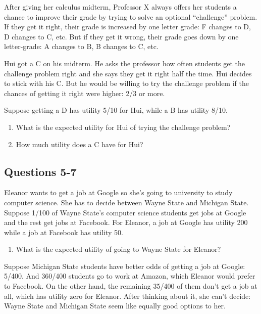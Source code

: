 \documentclass[
  11pt,
]{article}
\providecommand{\tightlist}{%
  \setlength{\itemsep}{0pt}\setlength{\parskip}{0pt}}
\begin{document}
After giving her calculus midterm, Professor X always offers her
students a chance to improve their grade by trying to solve an optional
``challenge'' problem. If they get it right, their grade is increased by
one letter grade: F changes to D, D changes to C, etc. But if they get
it wrong, their grade goes down by one letter-grade: A changes to B, B
changes to C, etc.

Hui got a C on his midterm. He asks the professor how often students get
the challenge problem right and she says they get it right half the
time. Hui decides to stick with his C. But he would be willing to try
the challenge problem if the chances of getting it right were higher:
2/3 or more.

Suppose getting a D has utility 5/10 for Hui, while a B has utility
8/10.

\begin{enumerate}
\def\labelenumi{\arabic{enumi}.}
\setcounter{enumi}{2}
\tightlist
\item
  What is the expected utility for Hui of trying the challenge problem?
\item
  How much utility does a C have for Hui?
\end{enumerate}

\hypertarget{questions-5-7}{%
\subsection{Questions 5-7}\label{questions-5-7}}

Eleanor wants to get a job at Google so she's going to university to
study computer science. She has to decide between Wayne State and
Michigan State. Suppose 1/100 of Wayne State's computer science students
get jobs at Google and the rest get jobs at Facebook. For Eleanor, a job
at Google has utility 200 while a job at Facebook has utility 50.

\begin{enumerate}
\def\labelenumi{\arabic{enumi}.}
\setcounter{enumi}{4}
\tightlist
\item
  What is the expected utility of going to Wayne State for Eleanor?
\end{enumerate}

Suppose Michigan State students have better odds of getting a job at
Google: 5/400. And 360/400 students go to work at Amazon, which Eleanor
would prefer to Facebook. On the other hand, the remaining 35/400 of
them don't get a job at all, which has utility zero for Eleanor. After
thinking about it, she can't decide: Wayne State and Michigan State seem
like equally good options to her.
\end{document}
